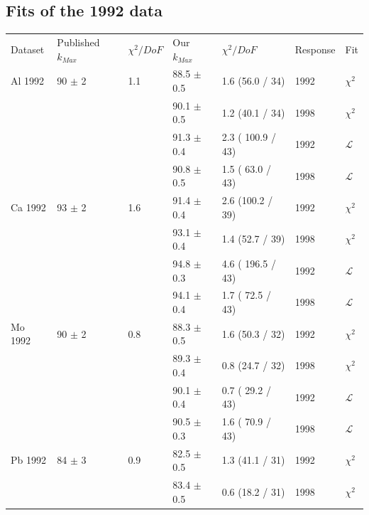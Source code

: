 \subsection { Fits of the 1992 data }
\begin{table}[h]
  \begin{center}
    \begin{tabular}{|l||l|l|l|l|l|l|}
      \hline
      Dataset & Published $k_{Max}$ & $\chi^2 / DoF$ & Our $k_{Max}$ & $\chi^2 / DoF$  & Response & Fit \\
      \hhline{|=||=|=|=|=|=|=|}
       Al 1992   & 90   $\pm$ 2   & 1.1 & 88.5 $\pm$ 0.5 &  1.6 (56.0 / 34) & 1992 & $\chi^2$ \\  
                 &                &     & 90.1 $\pm$ 0.5 &  1.2 (40.1 / 34) & 1998 & $\chi^2$ \\  
                                                                             
                 &                &     & 91.3 $\pm$ 0.4 & 2.3 ( 100.9 / 43)& 1992 & $\mathcal{L}$ \\
                 &                &     & 90.8 $\pm$ 0.5 & 1.5 ( 63.0 / 43) & 1998 & $\mathcal{L}$ \\
       \hline                                                                
       Ca 1992   & 93   $\pm$ 2   & 1.6 & 91.4 $\pm$ 0.4 &  2.6 (100.2 / 39)& 1992 & $\chi^2$ \\  
                 &                &     & 93.1 $\pm$ 0.4 &  1.4 (52.7 / 39) & 1998 & $\chi^2$ \\  
                                                                             
                 &                &     & 94.8 $\pm$ 0.3 & 4.6 ( 196.5 / 43)& 1992 & $\mathcal{L}$ \\
                 &                &     & 94.1 $\pm$ 0.4 & 1.7 ( 72.5 / 43) & 1998 & $\mathcal{L}$ \\
      \hline                                                                 
       Mo 1992   & 90   $\pm$ 2   & 0.8 & 88.3 $\pm$ 0.5 &  1.6 (50.3 / 32) & 1992 & $\chi^2$ \\  
                 &                &     & 89.3 $\pm$ 0.4 &  0.8 (24.7 / 32) & 1998 & $\chi^2$ \\  
                                                                             
                 &                &     & 90.1 $\pm$ 0.4 & 0.7 ( 29.2 / 43) & 1992 & $\mathcal{L}$ \\
                 &                &     & 90.5 $\pm$ 0.3 & 1.6 ( 70.9 / 43) & 1998 & $\mathcal{L}$ \\
      \hline                                                                 
       Pb 1992   & 84   $\pm$ 3   & 0.9 & 82.5 $\pm$ 0.5 &  1.3 (41.1 / 31) & 1992 & $\chi^2$ \\  
                 &                &     & 83.4 $\pm$ 0.5 &  0.6 (18.2 / 31) & 1998 & $\chi^2$ \\  
                                                                             

\end{tabular}
\end{center}
\end{table}
